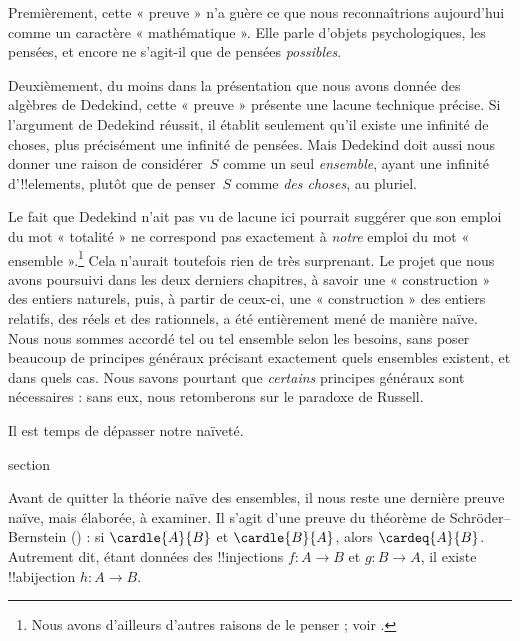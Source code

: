 \documentclass[11pt,a4paper,openany]{memoir}
\begin{document}
Premièrement, cette « preuve » n'a guère ce que nous reconnaîtrions
aujourd'hui comme un caractère « mathématique ». Elle parle d'objets
psychologiques, les pensées, et encore ne s'agit-il que de pensées
\emph{possibles}.

Deuxièmement, du moins dans la présentation que nous avons donnée des
algèbres de Dedekind, cette « preuve » présente une lacune technique
précise. Si l'argument de Dedekind réussit, il établit seulement qu'il
existe une infinité de choses, plus précisément une infinité de pensées.
Mais Dedekind doit aussi nous donner une raison de considérer~$S$ comme
un seul \emph{ensemble}, ayant une infinité d'!!{element}s, plutôt que
de penser~$S$ comme \emph{des choses}, au pluriel.

Le fait que Dedekind n'ait pas vu de lacune ici pourrait suggérer que
son emploi du mot « totalité » ne correspond pas exactement à
\emph{notre} emploi du mot « ensemble ».\footnote{Nous avons d'ailleurs
d'autres raisons de le penser ; voir \citet[p.~23]{Potter2004}.}
Cela n'aurait toutefois rien de très surprenant. Le projet que nous
avons poursuivi dans les deux derniers chapitres, à savoir une
« construction » des entiers naturels, puis, à partir de ceux-ci,
une « construction » des entiers relatifs, des réels et des rationnels,
a été entièrement mené de manière naïve. Nous nous sommes accordé tel
ou tel ensemble selon les besoins, sans poser beaucoup de principes
généraux précisant exactement quels ensembles existent, et dans quels cas.
Nous savons pourtant que \emph{certains} principes généraux sont
nécessaires : sans eux, nous retomberons sur le paradoxe de Russell.

Il est temps de dépasser notre naïveté.


\endgroup


\begingroup
\expandafter\def\csname ol@sectioncs\endcsname{section}
\def\olfilename{card-sb}




Avant de quitter la théorie naïve des ensembles, il nous reste une
dernière preuve naïve, mais élaborée, à examiner. Il s'agit d'une preuve
du théorème de Schröder--Bernstein
() : si $\cardle{A}{B}$ et
$\cardle{B}{A}$, alors $\cardeq{A}{B}$. Autrement dit, étant données
des !!{injection}s $f\colon A\to B$ et $g\colon B\to A$, il existe
!!a{bijection} $h\colon A\to B$.
\end{document}
